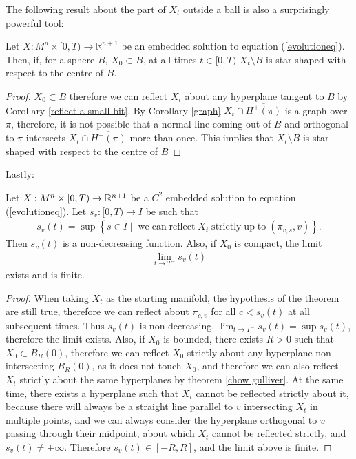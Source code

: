 The following result about the part of $X_t$ outside a ball is also a surprisingly powerful tool: 



\begin{cor}
	Let $ X : M^n \times [0, T) \to \mathbb{R}^{n+1} $ be an embedded solution to equation (\ref{evolutioneq}). Then, if, for a sphere $B$, $X_0\subset B$, at all times $t \in [0, T)$ $X_t\setminus B$ is star-shaped with respect to the centre of $B$.\label{starshaped}
\end{cor}

\begin{proof}
	$X_0\subset B$ therefore we can reflect $X_t$ about any hyperplane tangent to $B$ by Corollary \ref{reflect a small bit}. By Corollary \ref{graph} $X_t\cap\overline{H^+(\pi)}$ is a graph over $\pi$, therefore, it is not possible that a normal line coming out of $B$ and orthogonal to $\pi$ intersects  $X_t\cap\overline{H^+(\pi)}$ more than once. This implies that  $X_t\setminus B$ is star-shaped with respect to the centre of $B$
\end{proof}

Lastly: 
\begin{cor}
	Let $X:M^n\times [0,T) \rightarrow \mathbb{R}^{n+1}$ be a $C^2$ embedded solution to  equation (\ref{evolutioneq}). Let $s_v:[0,T) \rightarrow I$ be such that 
	\begin{align*}
		s_v(t)= \sup\left\{s \in I \;|\;  \; \mathrm{we \; can \; reflect \;} X_t \mathrm{ \; strictly \; up \; to }\; (\pi_{v, s}, v) \right\}.
	\end{align*}
	Then $s_v(t)$ is a non-decreasing function. Also, if $X_0$ is compact, the limit
	\begin{align*}
		\lim_{t\rightarrow T^-} s_v(t)
	\end{align*}
	exists and is finite.
\end{cor}
\begin{proof}
	When taking $X_t$ as the starting manifold, the hypothesis of the theorem are still true, therefore we can reflect about $\pi_{c, v}$  for all $c<s_v(t)$ at all subsequent times. Thus $s_v(t)$ is non-decreasing. $\lim_{t\rightarrow T^-} s_v(t) = \sup s_v(t)$, therefore the limit exists. Also, if $X_0$ is bounded, there exists $R>0$ such that $X_0\subset B_R(0)$, therefore we can reflect $X_0$ strictly about any hyperplane non intersecting $B_R(0)$, as it does not touch $X_0$, and therefore we can also reflect $X_t$ strictly about the same hyperplanes by theorem \ref{chow gulliver}. At the same time, there exists a hyperplane such that $X_t$ cannot be reflected strictly about it, because there will always be a straight line parallel to $v$ intersecting $X_t$ in multiple points, and we can always consider the hyperplane orthogonal to $v$ passing through their midpoint, about which $X_t$ cannot be reflected strictly, and $s_v(t) \neq +\infty$. Therefore  $s_v(t)\in [-R, R]$, and the limit above is finite. 
\end{proof}





